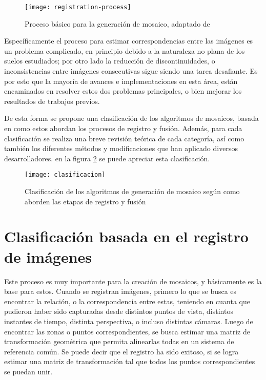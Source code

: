 \begin{figure}[H]
	\centerline{
		\texttt{[image: registration-process]}}
	\caption[Proceso básico para la generación de mosaico]{Proceso básico para la generación de mosaico, adaptado de \cite{capel}}
	\label{imagen:mosaic-process}
\end{figure}

Específicamente el proceso para estimar correspondencias entre las imágenes es un problema complicado, en principio debido a la naturaleza no plana de los suelos estudiados; por otro lado la reducción de discontinuidades, o inconsistencias entre imágenes consecutivas sigue siendo una tarea desafiante. Es por esto que la mayoría de avances e implementaciones en esta área, están encaminados en resolver estos dos problemas principales, o bien mejorar los resultados de trabajos previos.

De esta forma se propone una clasificación de los algoritmos de mosaicos, basada en como estos abordan los procesos de registro y fusión. Además, para cada clasificación se realiza una breve revisión teórica de cada categoría, así como también los diferentes métodos y modificaciones que han aplicado diversos desarrolladores. en la figura \ref{imagen:clasificacion} se puede apreciar esta clasificación.

\begin{figure}[H]
	\centerline{
		\texttt{[image: clasificacion]}}
	\caption[Clasificación de los algoritmos de generación de mosaico]{Clasificación de los algoritmos de generación de mosaico según como aborden las etapas de registro y fusión}
	
	\label{imagen:clasificacion}
\end{figure}


\section*{Clasificación basada en el registro de imágenes}

Este proceso es muy importante para la creación de mosaicos, y básicamente es la base para estos. Cuando se registran imágenes, primero lo que se busca es encontrar la relación, o la correspondencia entre estas, teniendo en cuanta que pudieron haber sido capturadas desde distintos puntos de vista, distintos instantes de tiempo, distinta perspectiva, o incluso distintas cámaras. Luego de encontrar las zonas o puntos correspondientes, se busca estimar una matriz de transformación geométrica que permita alinearlas todas en un sistema de referencia común. Se puede decir que el registro ha sido exitoso, si se logra estimar una matriz de transformación tal que todos los puntos correspondientes se puedan unir.

